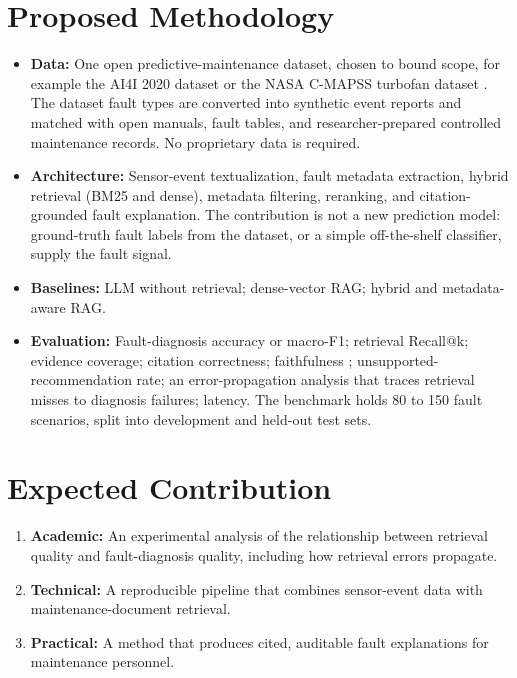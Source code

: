 \documentclass[10pt,a4paper]{article}
\begin{document}
\section{Proposed Methodology}

\begin{itemize}
    \item \textbf{Data:} One open predictive-maintenance dataset, chosen to bound scope, for example the AI4I 2020 dataset \cite{matzka2020} or the NASA C-MAPSS turbofan dataset \cite{saxena2008}. The dataset fault types are converted into synthetic event reports and matched with open manuals, fault tables, and researcher-prepared controlled maintenance records. No proprietary data is required.
    \item \textbf{Architecture:} Sensor-event textualization, fault metadata extraction, hybrid retrieval (BM25 and dense), metadata filtering, reranking, and citation-grounded fault explanation. The contribution is not a new prediction model: ground-truth fault labels from the dataset, or a simple off-the-shelf classifier, supply the fault signal.
    \item \textbf{Baselines:} LLM without retrieval; dense-vector RAG; hybrid and metadata-aware RAG.
    \item \textbf{Evaluation:} Fault-diagnosis accuracy or macro-F1; retrieval Recall@k; evidence coverage; citation correctness; faithfulness \cite{es2024ragas}; unsupported-recommendation rate; an error-propagation analysis that traces retrieval misses to diagnosis failures; latency. The benchmark holds 80 to 150 fault scenarios, split into development and held-out test sets.
\end{itemize}

\section{Expected Contribution}

\begin{enumerate}
    \item \textbf{Academic:} An experimental analysis of the relationship between retrieval quality and fault-diagnosis quality, including how retrieval errors propagate.
    \item \textbf{Technical:} A reproducible pipeline that combines sensor-event data with maintenance-document retrieval.
    \item \textbf{Practical:} A method that produces cited, auditable fault explanations for maintenance personnel.
\end{enumerate}
\end{document}
